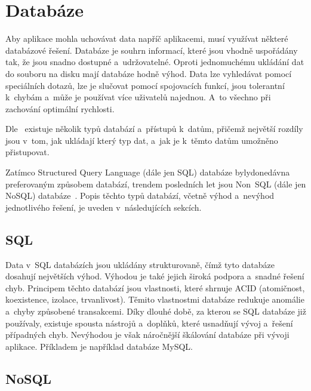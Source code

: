 \section{Databáze}

Aby aplikace mohla uchovávat data napříč aplikacemi,
musí využívat některé databázové řešení.
Databáze je souhrn informací,
které jsou vhodně uspořádány tak,
že jsou snadno dostupné a~udržovatelné.
Oproti jednomuchému ukládání dat do souboru na disku mají databáze hodně výhod.
Data lze \mbox{vyhledávat} pomocí speciálních dotazů,
lze je slučovat pomocí spojovacích funkcí,
jsou tolerantní k~chybám
a~může je používat více uživatelů najednou.
A~to všechno při zachování optimální rychlosti.~\cite{database}

Dle~\cite{sql_nosql} existuje několik typů databází a~přístupů k~datům,
přičemž největší rozdíly jsou v~tom,
jak ukládají který typ dat,
a~jak je k~těmto datům umožněno přistupovat.
\emph{}~\cite{sql_nosql}

Zatímco Structured Query Language (dále jen SQL) databáze 
byly\linebreak donedávna
preferovaným způsobem databází,
trendem posledních let jsou Non~SQL (dále jen NoSQL) databáze~\cite{sql_nosql}.
Popis těchto typů databází,
včetně výhod a~nevýhod jednotlivého řešení,
je uveden v~následujících sekcích.

\subsection{SQL}

Data v~SQL databázích jsou ukládány strukturovaně,
čímž tyto databáze dosahují největších výhod.
Výhodou je také jejich široká podpora a~snadné řešení chyb.
Principem těchto databází jsou vlastnosti,
které shrnuje ACID (atomičnost, koexistence, izolace, trvanlivost).
Těmito vlastnostmi databáze redukuje anomálie a~chyby způsobené transakcemi.
Díky dlouhé době,
za kterou se SQL databáze již používaly,
existuje spousta nástrojů a~doplňků,
které usnadňují vývoj a~řešení případných chyb.
Nevýhodou je však náročnější škálování databáze při vývoji aplikace.
Příkladem je například databáze MySQL.~\cite{sql_nosql}

\subsection{NoSQL}

